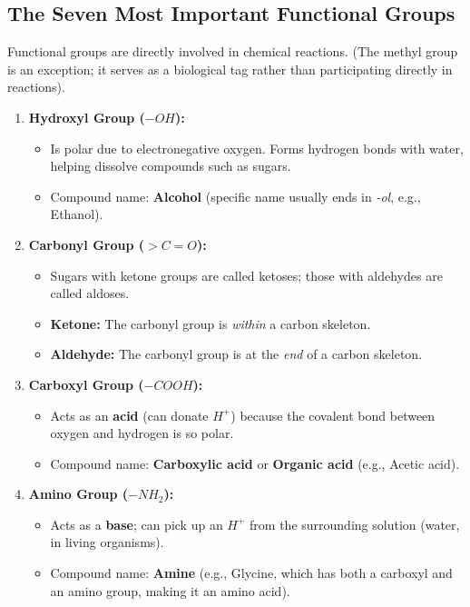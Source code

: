 \documentclass[11pt, a4paper]{article}
\begin{document}
\subsection*{The Seven Most Important Functional Groups}
Functional groups are directly involved in chemical reactions. (The methyl group is an exception; it serves as a biological tag rather than participating directly in reactions).
\begin{enumerate}
    \item \textbf{Hydroxyl Group ($-OH$):} 
    \begin{itemize}
        \item Is polar due to electronegative oxygen. Forms hydrogen bonds with water, helping dissolve compounds such as sugars.
        \item Compound name: \textbf{Alcohol} (specific name usually ends in \textit{-ol}, e.g., Ethanol).
    \end{itemize}
    \item \textbf{Carbonyl Group ($>C=O$):} 
    \begin{itemize}
        \item Sugars with ketone groups are called ketoses; those with aldehydes are called aldoses.
        \item \textbf{Ketone:} The carbonyl group is \textit{within} a carbon skeleton.
        \item \textbf{Aldehyde:} The carbonyl group is at the \textit{end} of a carbon skeleton.
    \end{itemize}
    \item \textbf{Carboxyl Group ($-COOH$):}
    \begin{itemize}
        \item Acts as an \textbf{acid} (can donate $H^+$) because the covalent bond between oxygen and hydrogen is so polar.
        \item Compound name: \textbf{Carboxylic acid} or \textbf{Organic acid} (e.g., Acetic acid).
    \end{itemize}
    \item \textbf{Amino Group ($-NH_2$):}
    \begin{itemize}
        \item Acts as a \textbf{base}; can pick up an $H^+$ from the surrounding solution (water, in living organisms).
        \item Compound name: \textbf{Amine} (e.g., Glycine, which has both a carboxyl and an amino group, making it an amino acid).
    \end{itemize}

\end{enumerate}
\end{document}
